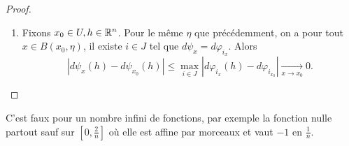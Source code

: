 \documentclass[12pt]{article}
\begin{document}
\begin{proof}
\begin{enumerate}
		\item Fixons $x_0\in U, h\in\mathbb{R}^{n}$. Pour le même $\eta$ que précédemment, on a pour tout $x\in B(x_{0},\eta)$, il existe $i\in J$ tel que $d\psi_{x}=d\varphi_{i_{x}}$. Alors 
		\begin{equation}
			\left\lvert d\psi_x(h)-d\psi_{x_{0}}(h)\right\rvert\leqslant\max\limits_{i\in J}\left\lvert d\varphi_{i_{x}}(h)-d\varphi_{i_{x_{0}}}\right\rvert\xrightarrow[x\to x_0]{}0.
		\end{equation}
	\end{enumerate}
\end{proof}

\begin{remark}
	C'est faux pour un nombre infini de fonctions, par exemple la fonction nulle partout sauf sur $\left[0,\frac{2}{n}\right]$ où elle est affine par morceaux et vaut $-1$ en $\frac{1}{n}$.
\end{remark}
\end{document}
